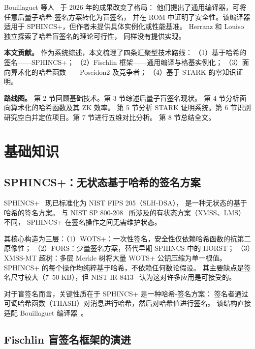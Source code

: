 \documentclass[11pt,a4paper]{ctexart}
\begin{document}
Bouillaguet 等人~\cite{Bouillaguet2026BlindingPH} 于 2026 年的成果改变了格局：
他们提出了通用编译器，可将任意后量子哈希-签名方案转化为盲签名，
并在 ROM 中证明了安全性。该编译器适用于 SPHINCS+，但作者未提供具体实例化或性能基准。
Herranz 和 Louiso~\cite{Herranz2025HashBased} 独立探索了哈希盲签名的理论可行性，
同样没有提供实现。

\medskip
\noindent\textbf{本文贡献。} 作为系统综述，本文梳理了四条汇聚型技术路线：
（1）基于哈希的签名——SPHINCS+；
（2）Fischlin 框架——通用编译与格基实例化；
（3）面向算术化的哈希函数——Poseidon2 及竞争者；
（4）基于 STARK 的零知识证明。

\medskip
\noindent\textbf{路线图。}
第 2 节回顾基础技术。第 3 节综述后量子盲签名现状。
第 4 节分析面向算术化的哈希函数及其 ZK 效率。
第 5 节分析 STARK 证明系统。第 6 节识别研究空白并定位项目。第 7 节进行五维对比分析。
第 8 节总结全文。

\section{基础知识}

\subsection{SPHINCS+：无状态基于哈希的签名方案}

SPHINCS+~\cite{Bernstein2019SPHINCS} 现已标准化为 NIST FIPS 205（SLH-DSA），
是一种无状态的基于哈希的签名方案。
与 NIST SP 800-208~\cite{NIST2020SP800} 所涉及的有状态方案（XMSS、LMS）不同，
SPHINCS+ 在签名操作之间无需维护状态。

其核心构造为三层：（1）WOTS+：一次性签名，安全性仅依赖哈希函数的抗第二原像性；
（2）FORS：少量签名方案，替代早期 SPHINCS 中的 HORST；
（3）XMSS-MT 超树：多层 Merkle 树将大量 WOTS+ 公钥压缩为单一根值。
SPHINCS+ 的每个操作均纯粹基于哈希，不依赖任何数论假设。
其主要缺点是签名尺寸较大（7--50 KB），但 NIST IR 8413~\cite{NIST2022IR8413}
认为这对许多应用是可接受的。

对于盲签名而言，关键性质在于 SPHINCS+ 是一种哈希-签名方案：
签名者通过可调哈希函数（THASH）对消息进行哈希，然后对哈希值进行签名。
该结构直接适配 Bouillaguet 编译器~\cite{Bouillaguet2026BlindingPH}。

\subsection{Fischlin 盲签名框架的演进}
\end{document}
